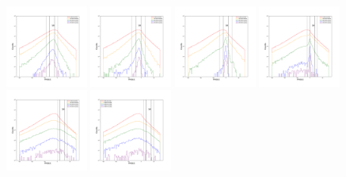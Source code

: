 \documentclass[12pt,prd]{article}
\begin{document}
\begin{figure}[h!]
\includegraphics[width=0.24\textwidth]{../figures/scanning_plotsgaiascan_l75_0_b66_4_ra216_0_dec41_0_npy_10.pdf}
\includegraphics[width=0.24\textwidth]{../figures/scanning_plotsgaiascan_l75_0_b66_4_ra216_0_dec41_0_npy_11.pdf}
\includegraphics[width=0.24\textwidth]{../figures/scanning_plotsgaiascan_l75_0_b66_4_ra216_0_dec41_0_npy_12.pdf}
\includegraphics[width=0.24\textwidth]{../figures/scanning_plotsgaiascan_l75_0_b66_4_ra216_0_dec41_0_npy_13.pdf}
\includegraphics[width=0.24\textwidth]{../figures/scanning_plotsgaiascan_l75_0_b66_4_ra216_0_dec41_0_npy_14.pdf}
\includegraphics[width=0.24\textwidth]{../figures/scanning_plotsgaiascan_l75_0_b66_4_ra216_0_dec41_0_npy_15.pdf}

\end{figure}
\end{document}
